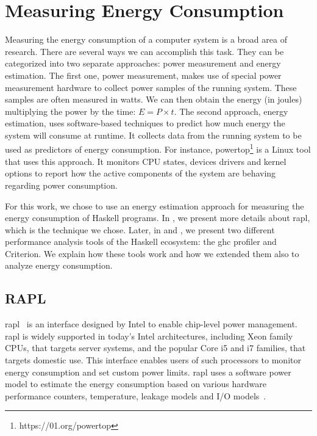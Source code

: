 \chapter{Measuring Energy Consumption}\label{chapter:tools}
Measuring the energy consumption of a computer system is a broad area of research. There are several ways we can accomplish this task. They can be categorized into two separate approaches: power measurement and energy estimation. The first one, power measurement, makes use of special power measurement hardware to collect power samples of the running system. These samples are often measured in watts. We can then obtain the energy (in joules) multiplying the power by the time: $E = P \times t$.
The second approach, energy estimation, uses software-based techniques to predict how much energy the system will consume at runtime. It collects data from the running system to be used as predictors of energy consumption. For instance, powertop\footnote{https://01.org/powertop} is a Linux tool that uses this approach. It monitors CPU states, devices drivers and kernel options to report how the active components of the system are behaving regarding power consumption.

For this work, we chose to use an energy estimation approach for measuring the energy consumption of Haskell programs. In , we present more details about \acs{rapl}, which is the technique we chose. Later, in  and , we present two different performance analysis tools of the Haskell ecosystem: the \acs{ghc} profiler and Criterion. We explain how these tools work and how we extended them also to analyze energy consumption.

\section{RAPL}\label{sec:rapl}
\ac{rapl}~\citep{david:2010} is an interface designed by Intel to enable chip-level power management. \acs{rapl} is widely supported in today's Intel architectures, including Xeon family CPUs, that targets server systems, and the popular Core i5 and i7 families, that targets domestic use. This interface enables users of such processors to monitor energy consumption and set custom
power limits. \acs{rapl} uses a software power model to estimate the energy consumption based on various hardware performance counters, temperature, leakage models and I/O models~\citep{weaver:2012}.

